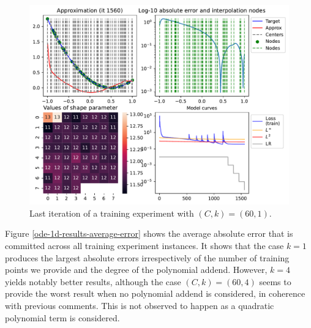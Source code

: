 \documentclass[12pt]{report} %
\begin{document}
\begin{figure}
  \includegraphics[width=\textwidth]{imagenes/experiments/1d/ode/TR60-C60-Kgaussian_kernel-Sh11.7188-13.csv-E1560.pdf}
  \caption{Last iteration of a training experiment with $(C,k)=(60,1)$.}
  \label{fig:last-iteration-ode-bad}
\end{figure}

Figure \ref{ode-1d-results-average-error} shows the average absolute error that is committed across all training experiment instances. It shows that the case $k=1$ produces the largest absolute errors irrespectively of the number of training points we provide and the degree of the polynomial addend. However, $k=4$ yields notably better results, although the case $(C,k)=(60,4)$ seems to provide the worst result when no polynomial addend is considered, in coherence with previous comments. This is not observed to happen as a quadratic polynomial term is considered.
\end{document}

